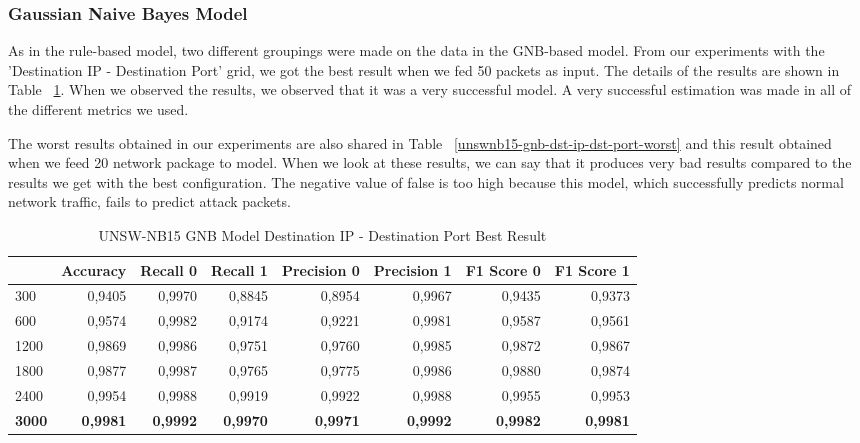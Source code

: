 \documentclass{article}
\begin{document}
\subsubsection{Gaussian Naive Bayes Model}

As in the rule-based model, two different groupings were made on the data in the GNB-based model. From our experiments with the 'Destination IP - Destination Port' grid, we got the best result when we fed 50 packets as input. The details of the results are shown in Table ~\ref{unswnb15-gnb-dst-ip-dst-port-best}. When we observed the results, we observed that it was a very successful model. A very successful estimation was made in all of the different metrics we used.

The worst results obtained in our experiments are also shared in Table ~\ref{unswnb15-gnb-dst-ip-dst-port-worst} and this result obtained when we feed 20 network package to model. When we look at these results, we can say that it produces very bad results compared to the results we get with the best configuration. The negative value of false is too high because this model, which successfully predicts normal network traffic, fails to predict attack packets.

\begin{table}
  \centering
  \caption{UNSW-NB15 GNB Model Destination IP - Destination Port Best Result}
  \label{unswnb15-gnb-dst-ip-dst-port-best}
  \begin{tabular}{lrrrrrrr}
    \toprule
	{ Pred Win & Accuracy & Recall 0 & Recall 1 & Precision 0 & Precision 1 & F1 Score 0 & F1 Score 1} \\
	\midrule
        300 & 0,9405 & 0,9970 & 0,8845 & 0,8954 & 0,9967 & 0,9435 & 0,9373 \\ \hline
        600 & 0,9574 & 0,9982 & 0,9174 & 0,9221 & 0,9981 & 0,9587 & 0,9561 \\ \hline
        1200 & 0,9869 & 0,9986 & 0,9751 & 0,9760 & 0,9985 & 0,9872 & 0,9867 \\ \hline
        1800 & 0,9877 & 0,9987 & 0,9765 & 0,9775 & 0,9986 & 0,9880 & 0,9874 \\ \hline
        2400 & 0,9954 & 0,9988 & 0,9919 & 0,9922 & 0,9988 & 0,9955 & 0,9953 \\ \hline
        \textbf{3000} & \textbf{0,9981} & \textbf{0,9992} & \textbf{0,9970} & \textbf{0,9971} & \textbf{0,9992} & \textbf{0,9982} & \textbf{0,9981} \\ 
	\bottomrule
  \end{tabular}
\end{table}
\end{document}
